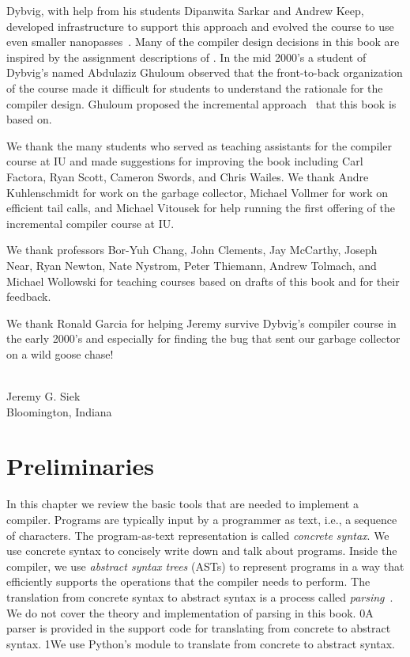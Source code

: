 \documentclass[7x10]{TimesAPriori_MIT}%
\def\racketEd{0}
\def\pythonEd{1}
\def\edition{1}
\newcommand{\racket}[1]{{\if\edition\racketEd{#1}\fi}}
\newcommand{\python}[1]{{\if\edition\pythonEd #1\fi}}
\begin{document}
Dybvig, with help from his students Dipanwita Sarkar and Andrew Keep,
developed infrastructure to support this approach and evolved the
course to use even smaller
nanopasses~\citep{Sarkar:2004fk,Keep:2012aa}.  Many of the compiler
design decisions in this book are inspired by the assignment
descriptions of \citet{Dybvig:2010aa}. In the mid 2000's a student of
Dybvig's named Abdulaziz Ghuloum observed that the front-to-back
organization of the course made it difficult for students to
understand the rationale for the compiler design. Ghuloum proposed the
incremental approach~\citep{Ghuloum:2006bh} that this book is based
on.

We thank the many students who served as teaching assistants for the
compiler course at IU and made suggestions for improving the book
including Carl Factora, Ryan Scott, Cameron Swords, and Chris
Wailes. We thank Andre Kuhlenschmidt for work on the garbage
collector, Michael Vollmer for work on efficient tail calls, and
Michael Vitousek for help running the first offering of the
incremental compiler course at IU.

We thank professors Bor-Yuh Chang, John Clements, Jay McCarthy, Joseph
Near, Ryan Newton, Nate Nystrom, Peter Thiemann, Andrew Tolmach, and
Michael Wollowski for teaching courses based on drafts of this book
and for their feedback.

We thank Ronald Garcia for helping Jeremy survive Dybvig's compiler
course in the early 2000's and especially for finding the bug that
sent our garbage collector on a wild goose chase!

\mbox{}\\
\noindent Jeremy G. Siek \\
Bloomington, Indiana

\mainmatter

\chapter{Preliminaries}
\label{ch:trees-recur}

In this chapter we review the basic tools that are needed to implement
a compiler. Programs are typically input by a programmer as text,
i.e., a sequence of characters. The program-as-text representation is
called \emph{concrete syntax}. We use concrete syntax to concisely
write down and talk about programs. Inside the compiler, we use
\emph{abstract syntax trees} (ASTs) to represent programs in a way
that efficiently supports the operations that the compiler needs to
perform. The translation
from concrete syntax to abstract syntax is a process called
\emph{parsing}~\citep{Aho:2006wb}. We do not cover the theory and
implementation of parsing in this book.
%
\racket{A parser is provided in the support code for translating from
  concrete to abstract syntax.}
%
\python{We use Python's  module to translate from concrete
  to abstract syntax.}
\end{document}
